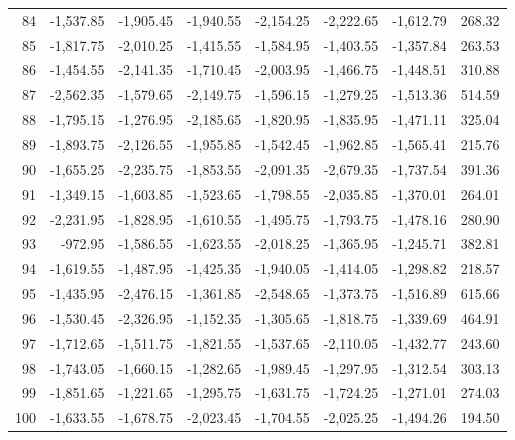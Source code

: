 \begin{longtable}{rrrrrrrr}
84 & -1,537.85 & -1,905.45 & -1,940.55 & -2,154.25 & -2,222.65 & -1,612.79 & 268.32  \\
85 & -1,817.75 & -2,010.25 & -1,415.55 & -1,584.95 & -1,403.55 & -1,357.84 & 263.53  \\
86 & -1,454.55 & -2,141.35 & -1,710.45 & -2,003.95 & -1,466.75 & -1,448.51 & 310.88  \\
87 & -2,562.35 & -1,579.65 & -2,149.75 & -1,596.15 & -1,279.25 & -1,513.36 & 514.59  \\
88 & -1,795.15 & -1,276.95 & -2,185.65 & -1,820.95 & -1,835.95 & -1,471.11 & 325.04  \\
89 & -1,893.75 & -2,126.55 & -1,955.85 & -1,542.45 & -1,962.85 & -1,565.41 & 215.76  \\
90 & -1,655.25 & -2,235.75 & -1,853.55 & -2,091.35 & -2,679.35 & -1,737.54 & 391.36  \\
91 & -1,349.15 & -1,603.85 & -1,523.65 & -1,798.55 & -2,035.85 & -1,370.01 & 264.01  \\
92 & -2,231.95 & -1,828.95 & -1,610.55 & -1,495.75 & -1,793.75 & -1,478.16 & 280.90  \\
93 & -972.95 & -1,586.55 & -1,623.55 & -2,018.25 & -1,365.95 & -1,245.71 & 382.81  \\
94 & -1,619.55 & -1,487.95 & -1,425.35 & -1,940.05 & -1,414.05 & -1,298.82 & 218.57  \\
95 & -1,435.95 & -2,476.15 & -1,361.85 & -2,548.65 & -1,373.75 & -1,516.89 & 615.66  \\
96 & -1,530.45 & -2,326.95 & -1,152.35 & -1,305.65 & -1,818.75 & -1,339.69 & 464.91  \\
97 & -1,712.65 & -1,511.75 & -1,821.55 & -1,537.65 & -2,110.05 & -1,432.77 & 243.60  \\
98 & -1,743.05 & -1,660.15 & -1,282.65 & -1,989.45 & -1,297.95 & -1,312.54 & 303.13  \\
99 & -1,851.65 & -1,221.65 & -1,295.75 & -1,631.75 & -1,724.25 & -1,271.01 & 274.03  \\
100 & -1,633.55 & -1,678.75 & -2,023.45 & -1,704.55 & -2,025.25 & -1,494.26 & 194.50  \\

\end{longtable}


